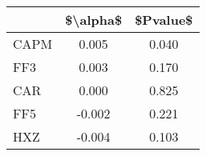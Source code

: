 \begin{tabular}{lcc}
\toprule
{} &  \$\textbackslash alpha\$ &  \$Pvalue\$ \\
\midrule
CAPM &     0.005 &     0.040 \\
FF3  &     0.003 &     0.170 \\
CAR  &     0.000 &     0.825 \\
FF5  &    -0.002 &     0.221 \\
HXZ  &    -0.004 &     0.103 \\
\bottomrule
\end{tabular}
